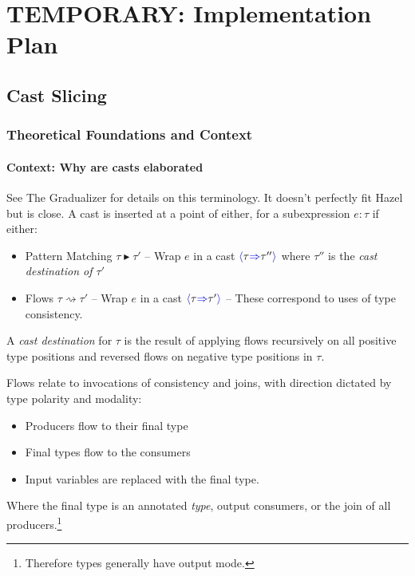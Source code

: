 \chapter{TEMPORARY: Implementation Plan}
\section{Cast Slicing}
\subsection{Theoretical Foundations and Context}
\subsubsection{Context: Why are casts elaborated}
See The Gradualizer \cite{Gradualizer} for details on this terminology. It doesn't perfectly fit Hazel but is close.
A cast is inserted at a point of either, for a subexpression $e : \tau$ if either:
\begin{itemize}
\item Pattern Matching $\tau \blacktriangleright \tau'$ -- Wrap $e$ in a cast ${\color{blue}\langle} \tau {\color{blue}\Rightarrow} \tau'' {\color{blue}\rangle}$ where $\tau''$ is the \textit{cast destination of $\tau'$}
\item  Flows $\tau \rightsquigarrow \tau'$ -- Wrap $e$ in a cast ${\color{blue}\langle} \tau {\color{blue}\Rightarrow} \tau' {\color{blue}\rangle}$ -- These correspond to uses of type consistency.
\end{itemize}
A \textit{cast destination} for $\tau$ is the result of applying flows recursively on all positive type positions and reversed flows on negative type positions in $\tau$.\par
Flows relate to invocations of consistency and joins, with direction dictated by type polarity and modality:
\begin{itemize}
\item Producers flow to their final type 
\item Final types flow to the consumers
\item Input variables are replaced with the final type.
\end{itemize}
Where the final type is an annotated \textit{type}, output consumers, or the join of all producers.\footnote{Therefore types generally have output mode.}
\par 

